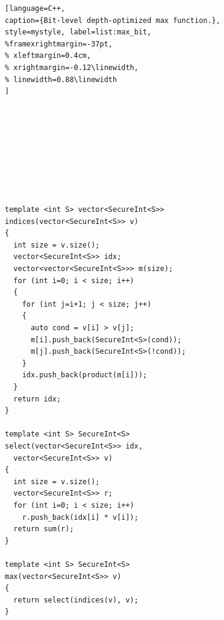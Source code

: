 \begin{figure}[t]
\begin{minipage}{\linewidth}
\begin{lstlisting}[language=C++,
caption={Bit-level depth-optimized max function.},
style=mystyle, label=list:max_bit,
%framexrightmargin=-37pt,
% xleftmargin=0.4cm,
% xrightmargin=-0.12\linewidth,
% linewidth=0.88\linewidth
]









template <int S> vector<SecureInt<S>>
indices(vector<SecureInt<S>> v)
{
  int size = v.size();
  vector<SecureInt<S>> idx;
  vector<vector<SecureInt<S>>> m(size);
  for (int i=0; i < size; i++)
  {
    for (int j=i+1; j < size; j++)
    {
      auto cond = v[i] > v[j];
      m[i].push_back(SecureInt<S>(cond));
      m[j].push_back(SecureInt<S>(!cond));
    }
    idx.push_back(product(m[i]));
  }
  return idx;
}

template <int S> SecureInt<S>
select(vector<SecureInt<S>> idx,
  vector<SecureInt<S>> v)
{
  int size = v.size();
  vector<SecureInt<S>> r;
  for (int i=0; i < size; i++)
    r.push_back(idx[i] * v[i]);
  return sum(r);
}

template <int S> SecureInt<S>
max(vector<SecureInt<S>> v)
{
  return select(indices(v), v);
}

\end{lstlisting}
\end{minipage}
\end{figure}

